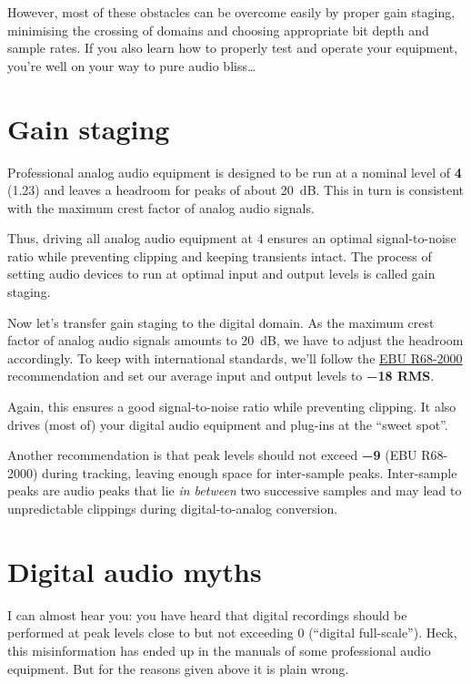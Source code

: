 However, most of these obstacles can be overcome easily by proper gain
staging, minimising the crossing of domains and choosing appropriate
bit depth and sample rates.  If you also learn how to properly test
and operate your equipment, you're well on your way to pure audio
bliss\dots

\section{Gain staging}
\label{sec:gain_staging}

Professional analog audio equipment is designed to be run at a nominal
level of \textbf{\SI[addsign=all]{+4}{\dBu}} (\SI{1.23}{\VRMS}) and
leaves a headroom for peaks of about \SI{20}{\dB}.  This in turn is
consistent with the maximum crest factor of analog audio signals.

Thus, driving all analog audio equipment at \SI[addsign=all]{+4}{\dBu}
ensures an optimal signal-to-noise ratio while preventing clipping and
keeping transients intact.  The process of setting audio devices to
run at optimal input and output levels is called gain staging.

Now let's transfer gain staging to the digital domain.  As the maximum
crest factor of analog audio signals amounts to \SI{20}{\dB}, we have
to adjust the headroom accordingly.  To keep with international
standards, we'll follow the
\href{http://tech.ebu.ch/publications/r068}{EBU R68-2000}
recommendation and set our average input and output levels to
\textbf{\SI{-18}{\dBFS} RMS}.

Again, this ensures a good signal-to-noise ratio while preventing
clipping.  It also drives (most of) your digital audio equipment and
plug-ins at the ``sweet spot''.

Another recommendation is that peak levels should not exceed
\textbf{\SI{-9}{\dBFS}} (EBU R68-2000) during tracking, leaving enough
space for inter-sample peaks.  Inter-sample peaks are audio peaks that
lie \emph{in between} two successive samples and may lead to
unpredictable clippings during digital-to-analog conversion.

\section{Digital audio myths}
\label{sec:digital_audio_myths}

I can almost hear you: you have heard that digital recordings should
be performed at peak levels close to but not exceeding \SI{0}{\dBFS}
(``digital full-scale'').  Heck, this misinformation has ended up in
the manuals of some professional audio equipment.  But for the reasons
given above it is plain wrong.

